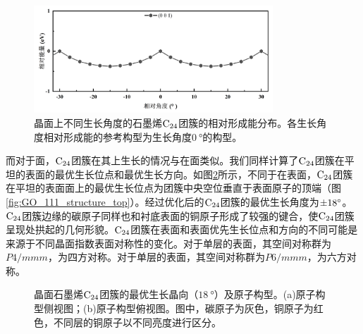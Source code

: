 \begin{figure}[htb]
    \includegraphics[width=0.8\textwidth]{pic/GO_C24_flat_001_energy.png}

    \caption{晶面上不同生长角度的石墨烯$\rm{C_{24}}$团簇的相对形成能分布。各生长角度相对形成能的参考构型为生长角度$\SI{0}{\degree}$的构型。
    }

    \label{fig:GO_001_energy}
\end{figure}

而对于面，$\rm{C_{24}}$团簇在其上生长的情况与在面类似。我们同样计算了$\rm{C_{24}}$团簇在平坦的表面的最优生长位点和最优生长方向。如图\ref{fig:GO_111_structure}所示，不同于在表面，$\rm{C_{24}}$团簇在平坦的表面面上的最优生长位点为团簇中央空位垂直于表面原子的顶端（图\ref{fig:GO_111_structure_top}）。经过优化后的$\rm{C_{24}}$团簇的最优生长角度为$\SI{\pm 18}{\degree}$。$\rm{C_{24}}$团簇边缘的碳原子同样也和衬底表面的铜原子形成了较强的键合，使$\rm{C_{24}}$团簇呈现处拱起的几何形貌。$\rm{C_{24}}$团簇在表面和表面优先生长位点和方向的不同可能是来源于不同晶面指数表面对称性的变化。对于单层的表面，其空间对称群为$P4/mmm$，为四方对称。对于单层的表面，其空间对称群为$P6/mmm$，为六方对称。

\begin{figure}[htb]

    \caption{晶面石墨烯$\rm{C_{24}}$团簇的最优生长晶向（$\SI{18}{\degree}$）及原子构型。(a)原子构型侧视图；(b)原子构型俯视图。图中，碳原子为灰色，铜原子为红色，不同层的铜原子以不同亮度进行区分。
    }

    \label{fig:GO_111_structure}
\end{figure}

